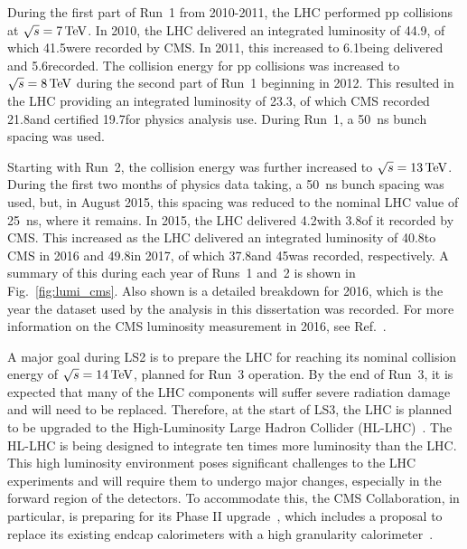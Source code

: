 During the first part of Run~1 from 2010-2011, the LHC performed pp collisions at $\sqrt{s} = 7\,\text{Te\hspace{-.08em}V}$. In 2010, the LHC delivered an integrated luminosity of 44.9\pbinv, of which 41.5\pbinv were recorded by CMS. In 2011, this increased to 6.1\fbinv being delivered and 5.6\fbinv recorded. The collision energy for pp collisions was increased to $\sqrt{s} = 8\,\text{Te\hspace{-.08em}V}$ during the second part of Run~1 beginning in 2012. This resulted in the LHC providing an integrated luminosity of 23.3\fbinv, of which CMS recorded 21.8\fbinv and certified 19.7\fbinv for physics analysis use. During Run~1, a 50~ns bunch spacing was used.

Starting with Run~2, the collision energy was further increased to $\sqrt{s} = 13\,\text{Te\hspace{-.08em}V}$. During the first two months of physics data taking, a 50~ns bunch spacing was used, but, in August 2015, this spacing was reduced to the nominal LHC value of 25~ns, where it remains. In 2015, the LHC delivered 4.2\fbinv with 3.8\fbinv of it recorded by CMS. This increased as the LHC delivered an integrated luminosity of 40.8\fbinv to CMS in 2016 and 49.8\fbinv in 2017, of which 37.8\fbinv and 45\fbinv was recorded, respectively.  A summary of this during each year of Runs~1 and~2 is shown in Fig.~\ref{fig:lumi_cms}. Also shown is a detailed breakdown for 2016, which is the year the dataset used by the analysis in this dissertation was recorded. For more information on the CMS luminosity measurement in 2016, see Ref.~\cite{CMS-PAS-LUM-17-001}.

A major goal during LS2 is to prepare the LHC for reaching its nominal collision energy of $\sqrt{s} = 14\,\text{Te\hspace{-.08em}V}$, planned for Run~3 operation. By the end of Run~3, it is expected that many of the LHC components will suffer severe radiation damage and will need to be replaced. Therefore, at the start of LS3, the LHC is planned to be upgraded to the High-Luminosity Large Hadron Collider (HL-LHC)~\cite{Apollinari:2284929}. The HL-LHC is being designed to integrate ten times more luminosity than the LHC. This high luminosity environment poses significant challenges to the LHC experiments and will require them to undergo major changes, especially in the forward region of the detectors. To accommodate this, the CMS Collaboration, in particular, is preparing for its Phase II upgrade~\cite{Contardo:2020886,Butler:2055167}, which includes a proposal to replace its existing endcap calorimeters with a high granularity calorimeter~\cite{Collaboration:2293646}. 

